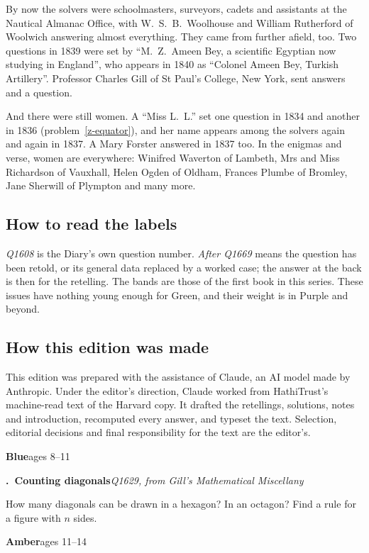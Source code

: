 \documentclass[11pt,a4paper]{article}
\newcounter{prob}
\newcommand{\prob}[3]{\par\bigskip\refstepcounter{prob}\label{#1}%
  \noindent\textbf{\theprob.\ #2}\hfill{\small\textit{#3}}\par\nopagebreak\smallskip}
\newcommand{\band}[3]{%
  \clearpage
  \begin{tcolorbox}[colback=#1!12,colframe=#1,boxrule=1pt,arc=2pt]
  {\Large\bfseries\color{#1} #2}\hfill{\large #3}
  \end{tcolorbox}}
\begin{document}
By now the solvers were schoolmasters, surveyors, cadets and assistants at the Nautical
Almanac Office, with W.~S.~B.~Woolhouse and William Rutherford of Woolwich answering
almost everything. They came from further afield, too. Two questions in 1839 were set by
``M.~Z.~Ameen Bey, a scientific Egyptian now studying in England'', who appears in 1840 as
``Colonel Ameen Bey, Turkish Artillery''. Professor Charles Gill of St Paul's College, New
York, sent answers and a question.

And there were still women. A ``Miss L.~L.'' set one question in 1834 and another in 1836
(problem~\ref{z-equator}), and her name appears among the solvers again and again in 1837.
A Mary Forster answered in 1837 too. In the enigmas and verse, women are everywhere:
Winifred Waverton of Lambeth, Mrs and Miss Richardson of Vauxhall, Helen Ogden of Oldham,
Frances Plumbe of Bromley, Jane Sherwill of Plympton and many more.

\subsection*{How to read the labels}

\textit{Q1608} is the Diary's own question number. \textit{After Q1669} means the question has
been retold, or its general data replaced by a worked case; the answer at the back is then
for the retelling. The bands are those of the first book in this series. These issues have
nothing young enough for Green, and their weight is in Purple and beyond.

\subsection*{How this edition was made}
This edition was prepared with the assistance of Claude, an AI model made by Anthropic.
Under the editor's direction, Claude worked from HathiTrust's machine-read text of the
Harvard copy. It drafted the retellings, solutions, notes and introduction, recomputed
every answer, and typeset the text. Selection, editorial decisions and final
responsibility for the text are the editor's.

\band{bandblue}{Blue}{ages 8--11}

\prob{z-diagonals}{Counting diagonals}{Q1629, from Gill's \textit{Mathematical Miscellany}}
How many diagonals can be drawn in a hexagon? In an octagon? Find a rule for a figure
with $n$ sides.

\band{bandamber}{Amber}{ages 11--14}
\end{document}
